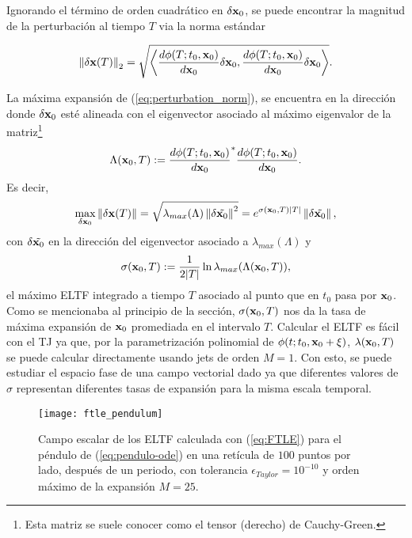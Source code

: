 Ignorando el término de orden cuadrático en $\delta \mathbf{x}_0$, se puede encontrar la magnitud de la perturbación al tiempo $T$ via la norma estándar

\begin{equation}
 \left\lVert\delta \mathbf{x}(T)\right\rVert_2 = \sqrt{ \left\langle \frac{d \phi(T;t_0, \mathbf{x}_0)}{d\mathbf{x}_0} \delta \mathbf{x}_0, \frac{d \phi(T;t_0, \mathbf{x}_0)}{d\mathbf{x}_0} \delta \mathbf{x}_0 \right\rangle }.
 \label{eq:perturbation_norm}
\end{equation}

La máxima expansión de (\ref{eq:perturbation_norm}), se encuentra en la dirección donde $\delta \mathbf{x}_0$ esté alineada con el eigenvector asociado al máximo eigenvalor de la matriz\footnote{Esta matriz se suele conocer como el tensor (derecho) de Cauchy-Green.}
\begin{equation}
 \Lambda(\mathbf{x}_0, T) := \frac{d \phi(T;t_0, \mathbf{x}_0)}{d\mathbf{x}_0}^* \frac{d \phi(T;t_0, \mathbf{x}_0)}{d\mathbf{x}_0}.
 \label{eq:finite_cgtensor} 
\end{equation}
Es decir, 
\begin{equation*}
 \max_{\delta \mathbf{x}_0} \left\lVert\delta \mathbf{x}(T) \right\rVert = \sqrt{ \lambda_{max}(\Lambda) \left\lVert \delta \tilde{\mathbf{x}_0}\right\rVert^2 } = e^{\sigma(\mathbf{x}_0,T)\lvert T \rvert} \left\lVert \delta \tilde{\mathbf{x}_0} \right\rVert  ,
\end{equation*}
con $ \delta \tilde{\mathbf{x}_0} $ en la dirección del eigenvector asociado a $\lambda_{max}(\Lambda)$ y
\begin{equation}
 \sigma(\mathbf{x}_0,T) := \frac{1}{2 \lvert T \rvert} \ln \lambda_{max}(\Lambda(\mathbf{x}_0, T)),
 \label{eq:FTLE}
\end{equation}
el máximo ELTF integrado a tiempo $T$ asociado al punto que en $t_0$ pasa por $\mathbf{x}_0$. Como se mencionaba al principio de la sección, $\sigma(\mathbf{x}_0,T)$ nos da la tasa de máxima expansión de $\mathbf{x}_0$ promediada en el intervalo $T$. Calcular el ELTF es fácil con el TJ ya que, por la parametrización polinomial de $\phi(t;t_0,\mathbf{x}_0 + \xi)$, $\lambda(\mathbf{x}_0,T)$ se puede calcular directamente usando jets de orden $M = 1$. Con esto, se puede estudiar el espacio fase de una campo vectorial dado ya que diferentes valores de $\sigma$ representan diferentes tasas de expansión para la misma escala temporal.

\begin{figure}[h!]
 \centering
 \texttt{[image: ftle\_pendulum]}
 \caption{Campo escalar de los ELTF calculada con (\ref{eq:FTLE}) para el péndulo de (\ref{eq:pendulo-ode}) en una retícula de $100$ puntos por lado, después de un periodo, con tolerancia $\epsilon_{Taylor} = 10^{-10}$ y orden máximo de la expansión $M = 25$.}
 \label{fig:ftle_pendulum}
\end{figure}

